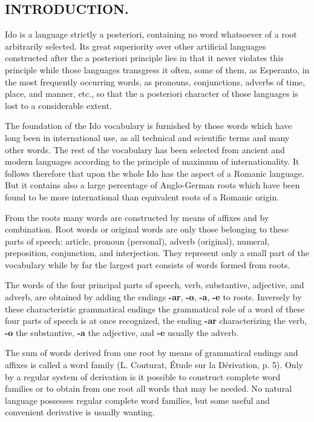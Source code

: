 \subsection*{INTRODUCTION.}
Ido is a language strictly a posteriori, containing no word whatsoever of a root arbitrarily selected. Its great superiority over other artificial languages constructed after the a posteriori principle lies in that it never violates this principle while those languages transgress it often, some of them, as Esperanto, in the most frequently occurring words, as pronouns, conjunctions, adverbs of time, place, and manner, etc., so that the a posteriori character of those languages is lost to a considerable extent. 

The foundation of the Ido vocabulary is furnished by those words which have long been in international use, as all technical and scientific terms and many other words. The rest of the vocabulary has been selected from ancient and modern languages according to the principle of maximum of internationality. It follows therefore that upon the whole Ido has the aspect of a Romanic language. But it contains also a large percentage of Anglo-German roots which have been found to be more international than equivalent roots of a Romanic origin. 

From the roots many words are constructed by means of affixes and by combination. Root words or original words are only those belonging to these parts of speech: article, pronoun (personal), adverb (original), numeral, preposition, conjunction, and interjection. They represent only a small part of the vocabulary while by far the largest part consists of words formed from roots. 

The words of the four principal parts of speech, verb, substantive, adjective, and adverb, are obtained by adding the endings \textbf{-ar}, \textbf{-o}, \textbf{-a}, \textbf{-e} to roots. Inversely by these characteristic grammatical endings the grammatical role of a word of these four parts of speech is at once recognized, the ending \textbf{-ar} characterizing the verb, \textbf{-o} the substantive, \textbf{-a} the adjective, and \textbf{-e} usually the adverb. 

The sum of words derived from one root by means of grammatical endings and affixes is called a word family (L. Couturat, Étude sur la Dérivation, p. 5). Only by a regular system of derivation is it possible to construct complete word families or to obtain from one root all words that may be needed. No natural language possesses regular complete word families, but some useful and convenient derivative is usually wanting. 


